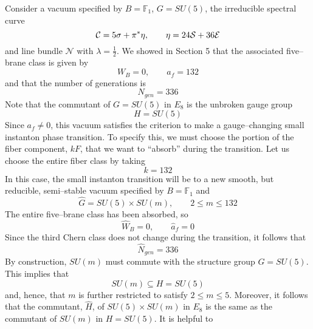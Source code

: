 \documentclass[a4paper,12pt]{article}
\numberwithin{equation}{section}
\def\cE{{\mathcal E}}
\def\cN{{\mathcal N}}
\def\cS{{\mathcal S}}
\theoremstyle{plain}
\begin{document}
Consider a vacuum specified by $B={\mathbb F}_{1}$, $G=SU(5)$, the
irreducible spectral curve
\begin{equation}
{\cal{C}}=5\sigma + \pi^{*}\eta, \qquad \eta= 24  \cS +36\cE
\label{eq:193}
\end{equation}
and line bundle $\cN$ with $\lambda=\frac{1}{2}$. We showed in Section 5 that
the associated five--brane class is given by
\begin{equation}
W_{B}=0, \qquad a_{f}=132
\label{eq:194}
\end{equation}
and that the number of generations is
\begin{equation}
N_{gen}=336
\label{eq:195}
\end{equation}
Note that the commutant of $G=SU(5)$ in $E_{8}$ is the unbroken gauge group
\begin{equation}
H=SU(5)
\label{eq:196}
\end{equation}
Since $a_{f}\neq 0$, this vacuum satisfies the criterion to make a
gauge--changing small instanton phase transition. To specify this, we must choose
the portion of the fiber component, $kF$, that we want to ``absorb'' during the
transition. Let us choose the entire fiber class by taking
\begin{equation}
k=132
\label{eq:197}
\end{equation}
In this case, the small instanton transition will be to a new smooth, but
reducible, semi--stable vacuum specified by $B={\mathbb F}_{1}$ and
\begin{equation}
\widehat{G}= SU(5) \times SU(m), \qquad 2 \leq m \leq 132
\label{eq:198}
\end{equation}
The entire five--brane class has been absorbed, so 
\begin{equation}
\widehat{W}_{B}=0, \qquad \hat{a}_{f}=0
\label{eq:199}
\end{equation}
Since the third Chern class does not change during the transition, it follows
that
\begin{equation}
\widehat{N}_{gen}=336
\label{eq:200}
\end{equation}
By construction, $SU(m)$ must commute with the structure group $G=SU(5)$.
This implies that 
\begin{equation}
SU(m) \subseteq H =SU(5)
\label{eq:201}
\end{equation}
and, hence, that $m$ is further restricted to satisfy $2 \leq m \leq 5$. 
Moreover, it follows that the commutant, $\widehat{H}$, of $SU(5) \times SU(m)$ 
in $E_{8}$ is the same as the commutant of $SU(m)$ in $H=SU(5)$. It is helpful to
\end{document}
